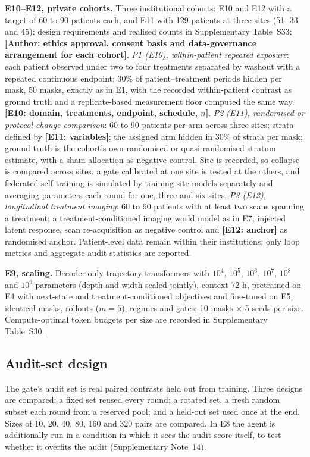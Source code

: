 \documentclass[11pt,a4paper]{article}
\newcommand{\tbd}[1]{{\color{red}\textbf{[#1]}}}
\newcommand{\authorpending}[1]{{\color{red}\textbf{[Author: #1]}}}
\begin{document}
\textbf{E10--E12, private cohorts.} Three institutional cohorts: E10 and E12 with a target of 60 to 90 patients each, and E11 with 129 patients at three sites (51, 33 and 45); design requirements and realised counts in Supplementary Table~S33; \authorpending{ethics approval, consent basis and data-governance arrangement for each cohort}. \emph{P1 (E10), within-patient repeated exposure}: each patient observed under two to four treatments separated by washout with a repeated continuous endpoint; 30\% of patient--treatment periods hidden per mask, 50 masks, exactly as in E1, with the recorded within-patient contrast as ground truth and a replicate-based measurement floor computed the same way. \tbd{E10: domain, treatments, endpoint, schedule, $n$}. \emph{P2 (E11), randomised or protocol-change comparison}: 60 to 90 patients per arm across three sites; strata defined by \tbd{E11: variables}; the assigned arm hidden in 30\% of strata per mask; ground truth is the cohort's own randomised or quasi-randomised stratum estimate, with a sham allocation as negative control. Site is recorded, so collapse is compared across sites, a gate calibrated at one site is tested at the others, and federated self-training is simulated by training site models separately and averaging parameters each round for one, three and six sites. \emph{P3 (E12), longitudinal treatment imaging}: 60 to 90 patients with at least two scans spanning a treatment; a treatment-conditioned imaging world model as in E7; injected latent response, scan re-acquisition as negative control and \tbd{E12: anchor} as randomised anchor. Patient-level data remain within their institutions; only loop metrics and aggregate audit statistics are reported.

\textbf{E9, scaling.} Decoder-only trajectory transformers with $10^4$, $10^5$, $10^6$, $10^7$, $10^8$ and $10^9$ parameters (depth and width scaled jointly), context 72 h, pretrained on E4 with next-state and treatment-conditioned objectives and fine-tuned on E5; identical masks, rollouts ($m=5$), regimes and gates; 10 masks $\times$ 5 seeds per size. Compute-optimal token budgets per size are recorded in Supplementary Table~S30.

\subsection{Audit-set design}
The gate's audit set is real paired contrasts held out from training. Three designs are compared: a fixed set reused every round; a rotated set, a fresh random subset each round from a reserved pool; and a held-out set used once at the end. Sizes of 10, 20, 40, 80, 160 and 320 pairs are compared. In E8 the agent is additionally run in a condition in which it sees the audit score itself, to test whether it overfits the audit (Supplementary Note~14).
\end{document}
